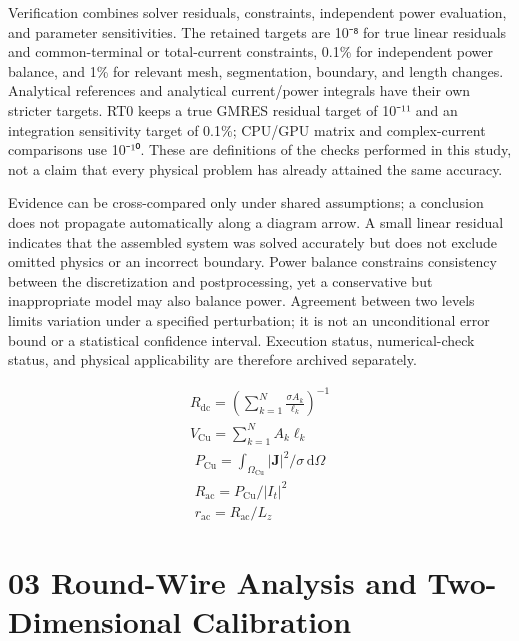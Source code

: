 \documentclass[11pt]{article}
\begin{document}
Verification combines solver residuals, constraints, independent power evaluation, and parameter sensitivities. The retained targets are 10⁻⁸ for true linear residuals and common-terminal or total-current constraints, 0.1\% for independent power balance, and 1\% for relevant mesh, segmentation, boundary, and length changes. Analytical references and analytical current/power integrals have their own stricter targets. RT0 keeps a true GMRES residual target of 10⁻¹¹ and an integration sensitivity target of 0.1\%; CPU/GPU matrix and complex-current comparisons use 10⁻¹⁰. These are definitions of the checks performed in this study, not a claim that every physical problem has already attained the same accuracy.


Evidence can be cross-compared only under shared assumptions; a conclusion does not propagate automatically along a diagram arrow. A small linear residual indicates that the assembled system was solved accurately but does not exclude omitted physics or an incorrect boundary. Power balance constrains consistency between the discretization and postprocessing, yet a conservative but inappropriate model may also balance power. Agreement between two levels limits variation under a specified perturbation; it is not an unconditional error bound or a statistical confidence interval. Execution status, numerical-check status, and physical applicability are therefore archived separately.


\hypertarget{E01}{}
\begin{equation}
\begin{gathered}
R_{\mathrm{dc}}=\left(\sum_{k=1}^{N}\frac{\sigma A_k}{\ell_k}\right)^{-1} \\
V_{\mathrm{Cu}}=\sum_{k=1}^{N}A_k\ell_k
\end{gathered}
\tag{1}\label{eq:E01}
\end{equation}
\hypertarget{E02}{}
\begin{equation}
\begin{gathered}
P_{\mathrm{Cu}}=\int_{\Omega_{\mathrm{Cu}}}|\mathbf J|^2/\sigma\,\mathrm d\Omega \\
R_{\mathrm{ac}}=P_{\mathrm{Cu}}/|I_t|^2 \\
r_{\mathrm{ac}}=R_{\mathrm{ac}}/L_z
\end{gathered}
\tag{2}\label{eq:E02}
\end{equation}
\FloatBarrier
\section*{03 Round-Wire Analysis and Two-Dimensional Calibration}
\hypertarget{chapter-03}{}
\end{document}

